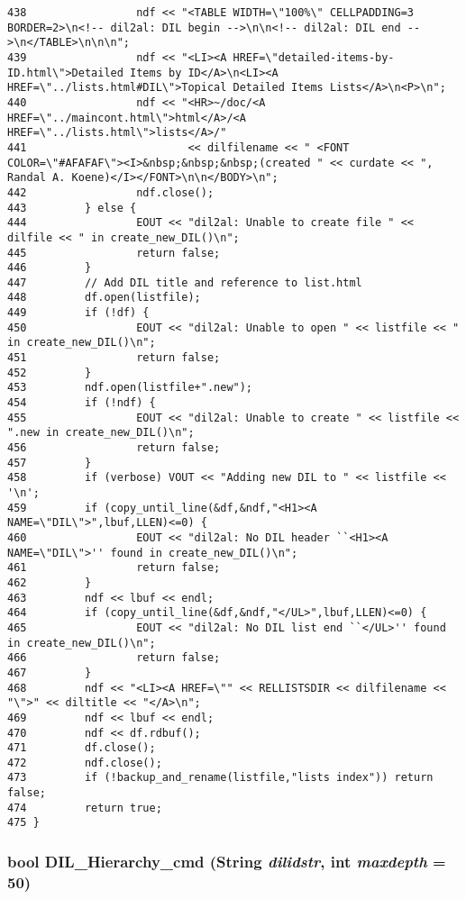 \begin{verbatim}
438                 ndf << "<TABLE WIDTH=\"100%\" CELLPADDING=3 BORDER=2>\n<!-- dil2al: DIL begin -->\n\n<!-- dil2al: DIL end -->\n</TABLE>\n\n\n";
439                 ndf << "<LI><A HREF=\"detailed-items-by-ID.html\">Detailed Items by ID</A>\n<LI><A HREF=\"../lists.html#DIL\">Topical Detailed Items Lists</A>\n<P>\n";
440                 ndf << "<HR>~/doc/<A HREF=\"../maincont.html\">html</A>/<A HREF=\"../lists.html\">lists</A>/"
441                         << dilfilename << " <FONT COLOR=\"#AFAFAF\"><I>&nbsp;&nbsp;&nbsp;(created " << curdate << ", Randal A. Koene)</I></FONT>\n\n</BODY>\n";
442                 ndf.close();
443         } else {
444                 EOUT << "dil2al: Unable to create file " << dilfile << " in create_new_DIL()\n";
445                 return false;
446         }
447         // Add DIL title and reference to list.html
448         df.open(listfile);
449         if (!df) {
450                 EOUT << "dil2al: Unable to open " << listfile << " in create_new_DIL()\n";
451                 return false;
452         }
453         ndf.open(listfile+".new");
454         if (!ndf) {
455                 EOUT << "dil2al: Unable to create " << listfile << ".new in create_new_DIL()\n";
456                 return false;
457         }
458         if (verbose) VOUT << "Adding new DIL to " << listfile << '\n';
459         if (copy_until_line(&df,&ndf,"<H1><A NAME=\"DIL\">",lbuf,LLEN)<=0) {
460                 EOUT << "dil2al: No DIL header ``<H1><A NAME=\"DIL\">'' found in create_new_DIL()\n";
461                 return false;
462         }
463         ndf << lbuf << endl;
464         if (copy_until_line(&df,&ndf,"</UL>",lbuf,LLEN)<=0) {
465                 EOUT << "dil2al: No DIL list end ``</UL>'' found in create_new_DIL()\n";
466                 return false;
467         }
468         ndf << "<LI><A HREF=\"" << RELLISTSDIR << dilfilename << "\">" << diltitle << "</A>\n";
469         ndf << lbuf << endl;
470         ndf << df.rdbuf();
471         df.close();
472         ndf.close();
473         if (!backup_and_rename(listfile,"lists index")) return false;
474         return true;
475 }
\end{verbatim}\normalsize 
{}
\subsubsection{\setlength{\rightskip}{0pt plus 5cm}bool DIL\_\-Hierarchy\_\-cmd ({\bf String} {\em dilidstr}, int {\em maxdepth} = 50)}\label{diladmin_8cc_a25}




